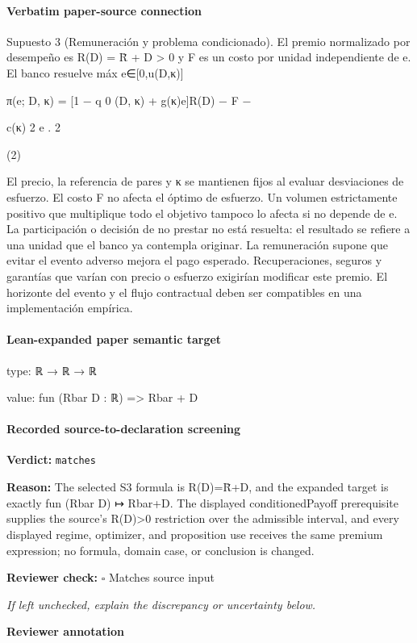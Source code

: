 \documentclass[10pt]{article}
\newcommand{\reviewerbox}{%
  \par\noindent\fbox{\parbox{0.96\linewidth}{\rule{0pt}{0.38in}}}\par
}
\newcommand{\reviewmatch}[1]{%
  \par\noindent\textbf{Reviewer check:} $\square$\; #1\par
  \noindent\emph{If left unchecked, explain the discrepancy or uncertainty below.}\par
}
\begin{document}
\paragraph{Verbatim paper-source connection}
\begin{ReviewVerbatim}
Supuesto 3 (Remuneración y problema condicionado). El premio normalizado por desempeño es
R(D) = R̄ + D > 0 y F es un costo por unidad independiente de e. El banco resuelve
máx
e∈[0,u(D,κ)]

π(e; D, κ) = [1 − q 0 (D, κ) + g(κ)e]R(D) − F −

c(κ) 2
e .
2

(2)

El precio, la referencia de pares y κ se mantienen ﬁjos al evaluar desviaciones de esfuerzo.
El costo F no afecta el óptimo de esfuerzo. Un volumen estrictamente positivo que multiplique
todo el objetivo tampoco lo afecta si no depende de e. La participación o decisión de no prestar
no está resuelta: el resultado se reﬁere a una unidad que el banco ya contempla originar. La remuneración supone que evitar el evento adverso mejora el pago esperado. Recuperaciones, seguros y
garantías que varían con precio o esfuerzo exigirían modiﬁcar este premio. El horizonte del evento
y el ﬂujo contractual deben ser compatibles en una implementación empírica.
\end{ReviewVerbatim}



\paragraph{Lean-expanded paper semantic target}
\begin{ReviewVerbatim}
type:
ℝ → ℝ → ℝ

value:
fun (Rbar D : ℝ) => Rbar + D
\end{ReviewVerbatim}


\paragraph{Recorded source-to-declaration screening}
\textbf{Verdict:} \texttt{matches}
\\
{\raggedright
\textbf{Reason:} The selected S3 formula is R(D)=R̄+D, and the expanded target is exactly fun (Rbar D) ↦ Rbar+D.\allowbreak{} The displayed conditionedPayoff prerequisite supplies the source's R(D)>0 restriction over the admissible interval, and every displayed regime, optimizer, and proposition use receives the same premium expression;\allowbreak{} no formula, domain case, or conclusion is changed.\allowbreak{}
\par}
\reviewmatch{Matches source input}
\noindent\textbf{Reviewer annotation}\par
\reviewerbox
\clearpage
\hypertarget{paper-prerequisite-e8657fe6a37f000a}{}
\end{document}
